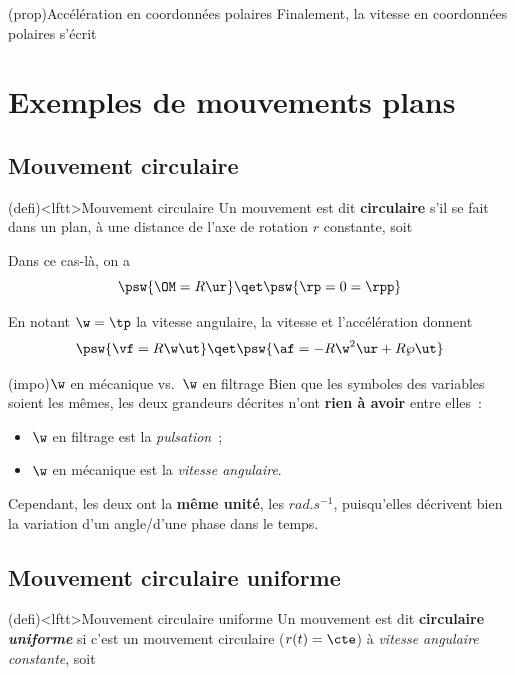 \documentclass[../../main/main.tex]{subfiles}
\begin{document}
\begin{tcb*}(prop){Accélération en coordonnées polaires}
	Finalement, la vitesse en coordonnées polaires s'écrit
	\psw{
		\[
			\boxed{
				\af = \left( \rpp -r\tp^2 \right)\ur + \left( 2\rp\tp+r\tpp \right)\ut
			}
		\]
	}
	\vspace{-15pt}
\end{tcb*}

\section{Exemples de mouvements plans}
\subsection{Mouvement circulaire}

\begin{tcb*}(defi)<lftt>{Mouvement circulaire}
	Un mouvement est dit \textbf{circulaire} s'il se fait dans un plan, à une
	distance de l'axe de rotation $r$ constante, soit
	\psw{
		\[
			r(t) = R
		\]
	}
	\vspace{-15pt}
\end{tcb*}

Dans ce cas-là, on a
\[
	\psw{\OM = R\ur}
	\qet
	\psw{\rp = 0 = \rpp}
\]

En notant $\w = \tp$ la vitesse angulaire, la vitesse et l'accélération donnent
\[
	\psw{\vf = R\w\ut}
	\qet
	\psw{\af = -R\w^2\ur + R\wp\ut}
\]

\begin{tcb*}(impo){$\w$ en mécanique vs.\ $\w$ en filtrage}
	Bien que les symboles des variables soient les mêmes, les deux grandeurs
	décrites n'ont \textbf{rien à avoir} entre elles~:
	\begin{itemize}
		\item $\w$ en filtrage est la \textit{pulsation}~;
		\item $\w$ en mécanique est la \textit{vitesse angulaire}.
	\end{itemize}
	Cependant, les deux ont la \textbf{même unité}, les $\si{rad.s^{-1}}$,
	puisqu'elles décrivent bien la variation d'un angle/d'une phase dans le temps.
\end{tcb*}

\subsection{Mouvement circulaire uniforme}
\begin{tcb*}(defi)<lftt>{Mouvement circulaire uniforme}
	Un mouvement est dit \textbf{circulaire \textit{uniforme}} si c'est un
	mouvement circulaire ($r(t) = \cte$) à \textit{vitesse angulaire
		constante}, soit
	\psw{
		\[
			\left\{
			\begin{array}{rcl}
				r(t)   & = & R  \\
				\tp(t) & = & \w
			\end{array}
			\right.
		\]
	}
\end{tcb*}
\end{document}
